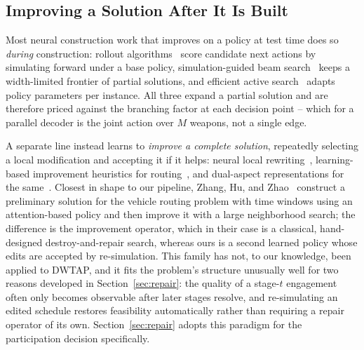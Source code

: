 \subsection{Improving a Solution After It Is Built}

Most neural construction work that improves on a policy at test time does so \emph{during} construction: rollout algorithms~\cite{bertsekas1997rollout} score candidate next actions by simulating forward under a base policy, simulation-guided beam search~\cite{choo2022sgbs} keeps a width-limited frontier of partial solutions, and efficient active search~\cite{hottung2022eas} adapts policy parameters per instance. All three expand a partial solution and are therefore priced against the branching factor at each decision point -- which for a parallel decoder is the joint action over $M$ weapons, not a single edge.

A separate line instead learns to \emph{improve a complete solution}, repeatedly selecting a local modification and accepting it if it helps: neural local rewriting~\cite{chen2019rewriter}, learning-based improvement heuristics for routing~\cite{wu2021improvement}, and dual-aspect representations for the same~\cite{ma2021dact}. Closest in shape to our pipeline, Zhang, Hu, and Zhao~\cite{zhang2025vrptw} construct a preliminary solution for the vehicle routing problem with time windows using an attention-based policy and then improve it with a large neighborhood search; the difference is the improvement operator, which in their case is a classical, hand-designed destroy-and-repair search, whereas ours is a second learned policy whose edits are accepted by re-simulation.
This family has not, to our knowledge, been applied to DWTAP, and it fits the problem's structure unusually well for two reasons developed in Section~\ref{sec:repair}: the quality of a stage-$t$ engagement often only becomes observable after later stages resolve, and re-simulating an edited schedule restores feasibility automatically rather than requiring a repair operator of its own. Section~\ref{sec:repair} adopts this paradigm for the participation decision specifically.

